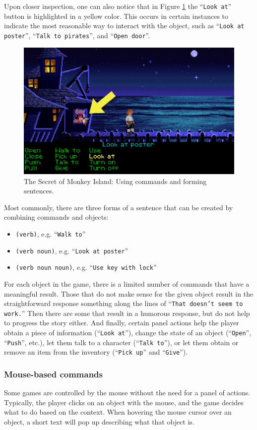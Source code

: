 Upon closer inspection, one can also notice that in Figure \ref{fig:C-TSoMI} the “\texttt{Look at}” button is highlighted in a yellow color. This occurs in certain instances to indicate the most reasonable way to interact with the object, such as “\texttt{Look at poster}”, “\texttt{Talk to pirates}”, and “\texttt{Open door}”.
\begin{figure}[H]
\centering
\includegraphics[width=.8\linewidth]{img/C-TSoMI.png}
\caption{The Secret of Monkey Island: Using commands and forming sentences.}
\label{fig:C-TSoMI}
\end{figure}

Most commonly, there are three forms of a sentence that can be created by combining commands and objects:
\begin{itemize}
    \item \verb|(verb)|, e.g. “\texttt{Walk to}”
    \item \verb|(verb noun)|, e.g. “\texttt{Look at poster}”
    \item \verb|(verb noun noun)|, e.g. “\texttt{Use key with lock}”
\end{itemize}
 
For each object in the game, there is a limited number of commands that have a meaningful result. Those that do not make sense for the given object result in the straightforward response something along the lines of “\texttt{That doesn't seem to work.}”  Then there are some that result in a humorous response, but do not help to progress the story either. And finally, certain panel actions help the player obtain a piece of information (“\texttt{Look at}”), change the state of an object (“\texttt{Open}”, “\texttt{Push}”, etc.), let them talk to a character (“\texttt{Talk to}”), or let them obtain or remove an item from the inventory (“\texttt{Pick up}” and “\texttt{Give}”).

\subsubsection{Mouse-based commands}
Some games are controlled by the mouse without the need for a panel of actions. Typically, the player clicks on an object with the mouse, and the game decides what to do based on the context. When hovering the mouse cursor over an object, a short text will pop up describing what that object is.

